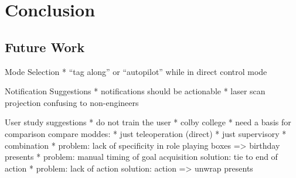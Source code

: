 \chapter{Conclusion}

\section{Future Work}
\label{section:futurework}

\begin{TODO}
Mode Selection
 * ``tag along'' or ``autopilot'' while in direct control mode

Notification Suggestions
 * notifications should be actionable
 * laser scan projection confusing to non-engineers

User study suggestions
 * do not train the user
    * colby college
 * need a basis for comparison
   compare moddes:
    * just teleoperation (direct)
    * just supervisory
    * combination
 * problem: lack of specificity in role playing
   boxes => birthday presents
 * problem: manual timing of goal acquisition
   solution: tie to end of action
 * problem: lack of action
   solution: action => unwrap presents
\end{TODO}